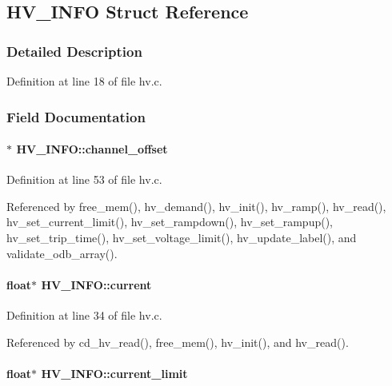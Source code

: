 \subsection{HV\_\-INFO Struct Reference}
\label{structHV__INFO}


\subsubsection{Detailed Description}


Definition at line 18 of file hv.c.

\subsubsection{Field Documentation}
\paragraph[{channel\_\-offset}]{$\ast$ {\bf HV\_\-INFO::channel\_\-offset}}\hfill\label{structHV__INFO_a2ee4d6a9ac2b672a8f9198abb3233c51}


Definition at line 53 of file hv.c.

Referenced by free\_\-mem(), hv\_\-demand(), hv\_\-init(), hv\_\-ramp(), hv\_\-read(), hv\_\-set\_\-current\_\-limit(), hv\_\-set\_\-rampdown(), hv\_\-set\_\-rampup(), hv\_\-set\_\-trip\_\-time(), hv\_\-set\_\-voltage\_\-limit(), hv\_\-update\_\-label(), and validate\_\-odb\_\-array().
\paragraph[{current}]{\setlength{\rightskip}{0pt plus 5cm}float$\ast$ {\bf HV\_\-INFO::current}}\hfill\label{structHV__INFO_aed0c3771d4b42de6ab316500e40eb09d}


Definition at line 34 of file hv.c.

Referenced by cd\_\-hv\_\-read(), free\_\-mem(), hv\_\-init(), and hv\_\-read().
\paragraph[{current\_\-limit}]{\setlength{\rightskip}{0pt plus 5cm}float$\ast$ {\bf HV\_\-INFO::current\_\-limit}}\hfill\label{structHV__INFO_ae416bc95f379ab67836cdf923ab5e3b6}


